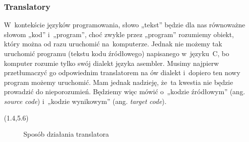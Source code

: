 \documentclass[10pt,t]{beamer}
\begin{document}





\begin{frame}
  \frametitle{Translatory}

  \vspace{-0.75em}


  W~kontekście języków programowania, słowo „tekst” będzie dla nas
  równoważne słowom „kod” i~„program”, choć zwykle przez „program”
  rozumiemy obiekt, który można od razu uruchomić na~komputerze. Jednak nie
  możemy tak uruchomić programu (tekstu kodu źródłowego)
  napisanego w~języku~C, bo komputer rozumie tylko swój dialekt języka
  asembler. Musimy najpierw przetłumaczyć go odpowiednim translatorem na ów
  dialekt i~dopiero ten nowy program możemy uruchomić. Mam jednak
  nadzieję, że~ta kwestia nie będzie prowadzić do nieporozumień.
  Będziemy więc mówić o~„kodzie źródłowym” (ang. \textit{source code})
  i~„kodzie wynikowym” (ang. \textit{target code}).





  \begin{textblock}{10.1}(1.4,5.6)

    \begin{figure}

      \label{fig:Translator-02}



      \caption{Sposób działania translatora}


    \end{figure}

  \end{textblock}

\end{frame}
\end{document}
